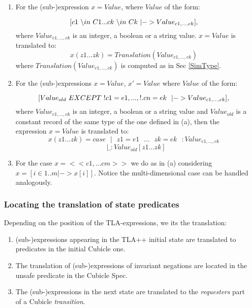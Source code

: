 \documentclass{article}
\theoremstyle{plain}
\numberwithin{equation}{section}
\begin{document}
\begin{enumerate} 
\item  For  the (sub-)expression \emph{$x=Value$}, where \emph{$Value$} of the form:

$$ [c1  \text{ }\backslash in \text{ } C1 ... ck  \text{ }\backslash in \text{ } Ck \text{ }  \text|{-} >Value_{c1,\dots,ck} ],$$
 where $Value_{c1,\dots,ck}$ is an integer, a boolean or a string value. \emph{$x=Value$} is translated to: 
 $$ x(z1 ... zk) = Translation(Value_{c1,\dots,ck})  $$
 where $Translation(Value_{c1,\dots,ck})$ is computed as in Sec \ref{SimType}.

\item  For  the (sub-)expressions \emph{$x=Value$}, \emph{$x'=Value$} where \emph{$Value$} of the form:

$$ [Value_{old}  \text{ } EXCEPT \text{ } !c1 =e1, ..., !.cn =ek \text{ }  \text{ }  \text|{-} >Value_{c1,\dots,ck} ],$$
 where $Value_{c1,\dots,ck}$ is an integer, a boolean or a string value and $Value_{old}$ is a constant record of the same type of the one defined in (a), then the expression \emph{$x=Value$} is translated to: 
 $$ x(z1 ... zk) = case \text{ } | \text{ } z1 = e1\text{ }  ... \text{ } zk=ek\text{ }  : Value_{c1,\dots,ck} $$
 $$ \text{ } | \_ : Value_{old}[z1 ... zk] $$
 
\item For the case $x=<<c1,...cm >> $ we do as in (a) considering  $x=[ i \in 1 ..m |-> x[i] ] $. Notice the multi-dimensional case can be handled analogously.  
\end{enumerate} 


\subsubsection{Locating  the translation of state predicates}

Depending on the position of the TLA-expressions,  we its the translation: 

\begin{enumerate}
\item  (sub-)expressions appearing in the TLA++ initial state are translated to  predicates  in the initial Cubicle one.   
\item The translation of (sub-)expressions of invariant negations are located in the unsafe predicate in the Cubicle Spec.  
\item The (sub-)expressions in the next state are translated to the \emph{requesters} part of a Cubicle \emph{transition}. 


\end{enumerate}
\end{document}
